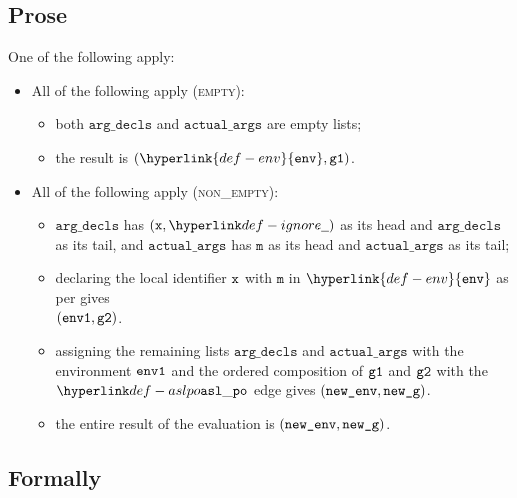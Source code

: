 \documentclass{book}
\newcommand\ordered[3]{{#1}\hyperlink{def-ordered}{\xrightarrow{#2}}{#3}}
\newcommand\assignargs[0]{\hyperlink{def-assignargs}{\texttt{assign\_args}}}
\newcommand\declarelocalidentifiermm[0]{\hyperlink{def-declarelocalidentifermm}{\texttt{declare\_local\_identifier\_mm}}}
\newcommand\env[0]{\hyperlink{def-env}{\texttt{env}}}
\newcommand\vg[0]{\texttt{g}}
\newcommand\newg[0]{\texttt{new\_g}}
\newcommand\vm[0]{\texttt{m}}
\newcommand\actualargs[0]{\texttt{actual\_args}}
\newcommand\argdecls[0]{\texttt{arg\_decls}}
\begin{document}
\subsection{Prose}
One of the following apply:
\begin{itemize}
  \item All of the following apply (\textsc{empty}):
  \begin{itemize}
    \item both $\argdecls$ and $\actualargs$ are empty lists;
    \item the result is $(\env, \vgone)$.
  \end{itemize}

  \item All of the following apply (\textsc{non\_empty}):
  \begin{itemize}
    \item $\argdecls$ has $(\vx, \Ignore)$ as its head and $\argdecls$ as its tail,
    and $\actualargs$ has $\vm$ as its head and $\actualargs$ as its tail;
    \item declaring the local identifier $\texttt{x}$ with $\vm$ in $\env$ as per 
    gives \\ $(\texttt{env1}, \texttt{g2})$.
    \item assigning the remaining lists $\argdecls$ and $\actualargs$ with the environment $\texttt{env1}$ and the ordered
    composition of $\texttt{g1}$ and $\texttt{g2}$ with the $\aslpo$ edge gives $(\newenv, \newg)$.
    \item the entire result of the evaluation is $(\newenv, \newg)$.
  \end{itemize}
\end{itemize}

\begin{emptyformal}
\subsection{Formally}
\end{emptyformal}
\end{document}
